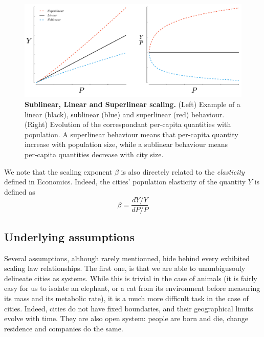 \begin{figure}[!h]
    \centering
    \includegraphics[width=\textwidth]{gfx/chapter-scaling/scaling_scheme.pdf}
    \caption{{\bf Sublinear, Linear and Superlinear scaling.} (Left) Example of a linear (black), sublinear (blue) and superlinear (red)
    behaviour. (Right) Evolution of the correspondant per-capita quantities with
population. A superlinear behaviour means that per-capita quantity increase with
population size, while a sublinear behaviour means per-capita quantities
decrease with city size.\label{fig:scaling_scheme}}
\end{figure}


We note that the scaling exponent $\beta$ is also directely related to the \emph{elasticity}
defined in Economics. Indeed, the cities' population elasticity of the quantity
$Y$ is defined as\\

\begin{equation}
    \beta = \frac{dY/Y}{dP/P}
\end{equation}


\subsection{Underlying assumptions}
\label{sub:underlying_asumptions}


Several assumptions, although rarely mentionned, hide behind every exhibited
scaling law relationships. The first one, is that we are able to unambigusouly
delineate cities as systems.  While this is trivial in the case of animals (it
is fairly easy for us to isolate an elephant, or a cat from its environment
before 
measuring its mass and its metabolic rate), it is a much more difficult task in
the case of cities. Indeed, cities do not have fixed boundaries, and their 
geographical limits evolve with time. They are also open system:
people are born and die, change residence and companies do the same. 

